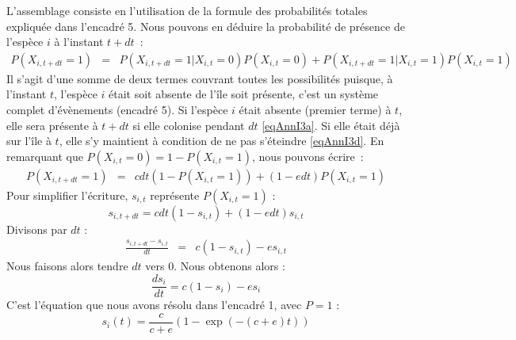 L'assemblage consiste en l'utilisation de la formule des probabilités totales expliquée dans l'encadré 5. Nous pouvons en déduire la probabilité de présence de l'espèce $i$ à l'instant $t+dt$~:
\begin{eqnarray}
\label{eqAnnI4} P(X_{i,t+dt}=1)&=&P(X_{i,t+dt}=1|X_{i,t}=0)P(X_{i,t}=0)+P(X_{i,t+dt}=1|X_{i,t}=1)P(X_{i,t}=1)
\end{eqnarray}
Il s'agit d'une somme de deux termes couvrant toutes les possibilités puisque, à l'instant $t$, l'espèce $i$ était soit absente de l'île soit présente, c'est un système complet d'évènements (encadré 5). Si l'espèce $i$ était absente (premier terme) à $t$, elle sera présente à $t+dt$ si elle colonise pendant $dt$ \eqref{eqAnnI3a}. Si elle était déjà sur l'île à $t$, elle s'y maintient à condition de ne pas s'éteindre \eqref{eqAnnI3d}. En remarquant que $P(X_{i,t}=0)=1-P(X_{i,t}=1)$, nous pouvons écrire~:
\begin{eqnarray}
\label{eqAnnI5a} P(X_{i,t+dt}=1)&=&cdt(1-P(X_{i,t}=1))+(1-edt)P(X_{i,t}=1)
\end{eqnarray}
Pour simplifier l'écriture, $s_{i,t}$ représente $P(X_{i,t}=1)$ :
\begin{equation}
\label{eqAnnI5b} s_{i,t+dt}=cdt(1-s_{i,t})+(1-edt)s_{i,t}
\end{equation}
Divisons par $dt$ :
\begin{eqnarray}
\label{eqAnnI5c} \frac{s_{i,t+dt}-s_{i,t}}{dt}&=&c(1-s_{i,t})-es_{i,t}
\end{eqnarray}
Nous faisons alors tendre $dt$ vers 0. Nous obtenons alors :
\begin{equation}
\label{eqAnnI5e} \frac{ds_{i}}{dt}=c(1-s_{i})-es_{i}
\end{equation}
C'est l'équation que nous avons résolu dans l'encadré 1, avec $P=1$  :
\begin{equation}
\label{eqAnnI5e} s_{i}(t)=\frac{c}{c+e} \left(1-\exp{(-(c+e)t)}\right)
\end{equation}

